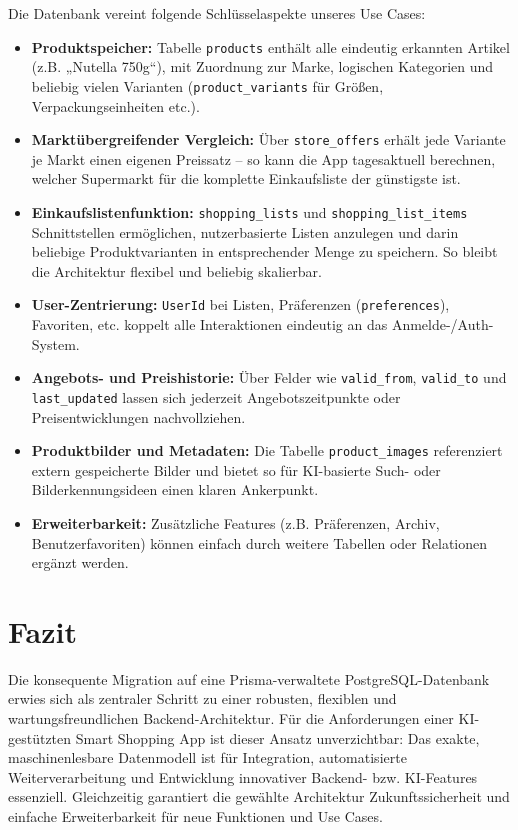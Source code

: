 \documentclass[12pt, a4paper]{report} %
\begin{document}
Die Datenbank vereint folgende Schlüsselaspekte unseres Use Cases:
\begin{itemize}
    \item \textbf{Produktspeicher:} Tabelle \texttt{products} enthält alle eindeutig erkannten Artikel (z.B. „Nutella 750g“), mit Zuordnung zur Marke, logischen Kategorien und beliebig vielen Varianten (\texttt{product\_variants} für Größen, Verpackungseinheiten etc.).
    \item \textbf{Marktübergreifender Vergleich:} Über \texttt{store\_offers} erhält jede Variante je Markt einen eigenen Preissatz – so kann die App tagesaktuell berechnen, welcher Supermarkt für die komplette Einkaufsliste der günstigste ist.
    \item \textbf{Einkaufslistenfunktion:} \texttt{shopping\_lists} und \texttt{shopping\_list\_items} Schnittstellen ermöglichen, nutzerbasierte Listen anzulegen und darin beliebige Produktvarianten in entsprechender Menge zu speichern. So bleibt die Architektur flexibel und beliebig skalierbar.
    \item \textbf{User-Zentrierung:} \texttt{UserId} bei Listen, Präferenzen (\texttt{preferences}), Favoriten, etc. koppelt alle Interaktionen eindeutig an das Anmelde-/Auth-System.
    \item \textbf{Angebots- und Preishistorie:} Über Felder wie \texttt{valid\_from}, \texttt{valid\_to} und \texttt{last\_updated} lassen sich jederzeit Angebotszeitpunkte oder Preisentwicklungen nachvollziehen.
    \item \textbf{Produktbilder und Metadaten:} Die Tabelle \texttt{product\_images} referenziert extern gespeicherte Bilder und bietet so für KI-basierte Such- oder Bilderkennungsideen einen klaren Ankerpunkt.
    \item \textbf{Erweiterbarkeit:} Zusätzliche Features (z.B. Präferenzen, Archiv, Benutzerfavoriten) können einfach durch weitere Tabellen oder Relationen ergänzt werden.
\end{itemize}

\section{Fazit}

Die konsequente Migration auf eine Prisma-verwaltete PostgreSQL-Datenbank erwies sich als zentraler Schritt zu einer robusten, flexiblen und wartungsfreundlichen Backend-Architektur. Für die Anforderungen einer KI-gestützten Smart Shopping App ist dieser Ansatz unverzichtbar: Das exakte, maschinenlesbare Datenmodell ist für Integration, automatisierte Weiterverarbeitung und Entwicklung innovativer Backend- bzw. KI-Features essenziell. Gleichzeitig garantiert die gewählte Architektur Zukunftssicherheit und einfache Erweiterbarkeit für neue Funktionen und Use Cases.
\end{document}
